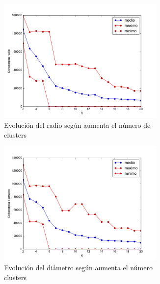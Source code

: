 \documentclass[11pt,a4paper]{article}
\begin{document}
\begin{figure}[h]
\begin{subfigure}{0.45\textwidth}
  \centering
    \includegraphics[width=0.9\textwidth]{img/radio_maxMin.png}
    \caption{Evolución del radio según aumenta el número de clusters}
    \label{fig:radio} 
\end{subfigure}
\hspace{0.1\textwidth}
\begin{subfigure}{0.45\textwidth}
    \includegraphics[width=0.9\textwidth]{img/diametro_maxMin.png}
    \caption{Evolución del diámetro según aumenta el número clusters}
    \label{fig:diametro}
\end{subfigure}
\begin{subfigure}{\textwidth}

\end{subfigure}
\end{figure}
\end{document}
